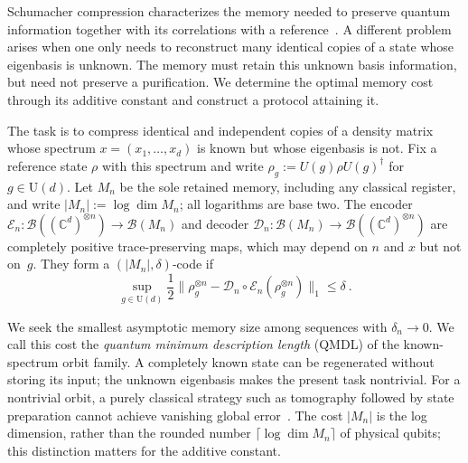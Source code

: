\documentclass[a4paper,onecolumn,11pt]{quantumarticle}
\def\D{\mathcal{D}}
\def\E{\mathcal{E}}
\begin{document}
Schumacher compression characterizes the memory needed to preserve quantum information together with its correlations with a reference~\cite{schumacher1995quantum}. A different problem arises when one only needs to reconstruct many identical copies of a state whose eigenbasis is unknown. The memory must retain this unknown basis information, but need not preserve a purification. We determine the optimal memory cost through its additive constant and construct a protocol attaining it.

The task is to compress identical and independent copies of a density matrix whose spectrum $x=(x_1,\ldots,x_d)$ is known but whose eigenbasis is not. Fix a reference state $\rho$ with this spectrum and write $\rho_g:=U(g)\rho U(g)^\dagger$ for $g\in\mathrm U(d)$. Let $M_n$ be the sole retained memory, including any classical register, and write $|M_n|:=\log\dim M_n$; all logarithms are base two. The encoder $\E_n:\mathcal B((\mathbb C^d)^{\otimes n})\to\mathcal B(M_n)$ and decoder $\D_n:\mathcal B(M_n)\to\mathcal B((\mathbb C^d)^{\otimes n})$ are completely positive trace-preserving maps, which may depend on $n$ and $x$ but not on~$g$. They form a $(|M_n|,\delta)$-code if
\begin{equation}\label{eq:error}
   \sup_{g\in\mathrm U(d)}\frac12
   \|\rho_g^{\otimes n}-\D_n\circ\E_n(\rho_g^{\otimes n})\|_1\le\delta\ .
\end{equation} 

We seek the smallest asymptotic memory size among sequences with $\delta_n\to0$. We call this cost the \emph{quantum minimum description length} (QMDL) of the known-spectrum orbit family. A completely known state can be regenerated without storing its input; the unknown eigenbasis makes the present task nontrivial. For a nontrivial orbit, a purely classical strategy such as tomography followed by state preparation cannot achieve vanishing global error~\cite{yang2018compression}. The cost $|M_n|$ is the log dimension, rather than the rounded number $\lceil\log\dim M_n\rceil$ of physical qubits; this distinction matters for the additive constant.
\end{document}
